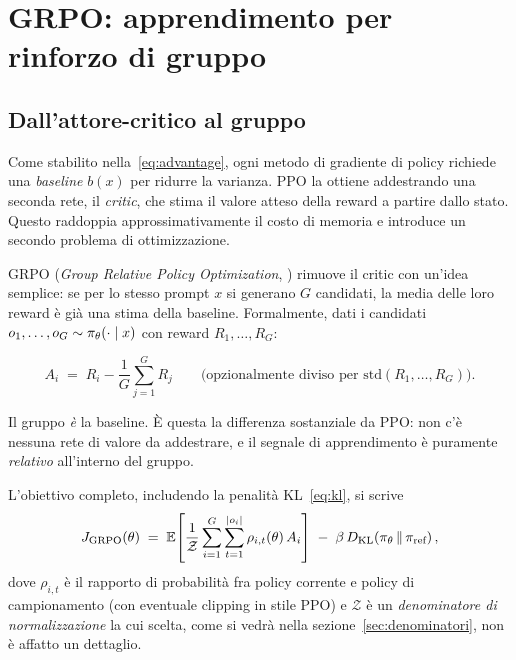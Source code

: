\chapter{GRPO: apprendimento per rinforzo di gruppo}
\label{cap:grpo}

\section{Dall'attore-critico al gruppo}

Come stabilito nella~\eqref{eq:advantage}, ogni metodo di gradiente di policy
richiede una \emph{baseline} $b(x)$ per ridurre la varianza. PPO
\cite{schulman2017ppo} la ottiene addestrando una seconda rete, il \emph{critic},
che stima il valore atteso della reward a partire dallo stato. Questo raddoppia
approssimativamente il costo di memoria e introduce un secondo problema di
ottimizzazione.

GRPO (\emph{Group Relative Policy Optimization},
\cite{shao2024grpo,guo2025r1}) rimuove il critic con un'idea semplice: se per lo
stesso prompt $x$ si generano $G$ candidati, la media delle loro reward è già una
stima della baseline. Formalmente, dati i candidati
$o_1, \dots, o_G \sim \pi_\theta(\cdot \mid x)$ con reward $R_1, \dots, R_G$:

\begin{equation}
  \label{eq:grpo-adv}
  A_i \;=\; R_i - \frac{1}{G}\sum_{j=1}^{G} R_j
  \qquad\text{(opzionalmente diviso per }
  \mathrm{std}(R_1,\dots,R_G)\text{)}.
\end{equation}

Il gruppo \emph{è} la baseline. È questa la differenza sostanziale da PPO: non
c'è nessuna rete di valore da addestrare, e il segnale di apprendimento è
puramente \emph{relativo} all'interno del gruppo.

L'obiettivo completo, includendo la penalità KL~\eqref{eq:kl}, si scrive
\begin{equation}
  \label{eq:grpo-objective}
  J_{\text{GRPO}}(\theta)
  \;=\;
  \mathbb{E}\!\left[
    \frac{1}{\mathcal{Z}} \sum_{i=1}^{G} \sum_{t=1}^{|o_i|}
    \rho_{i,t}(\theta)\, A_i
  \right]
  \;-\; \beta\, D_{\mathrm{KL}}\!\left(\pi_\theta \,\|\, \pi_{\text{ref}}\right),
\end{equation}
dove $\rho_{i,t}$ è il rapporto di probabilità fra policy corrente e policy di
campionamento (con eventuale clipping in stile PPO) e $\mathcal{Z}$ è un
\emph{denominatore di normalizzazione} la cui scelta, come si vedrà nella
sezione~\ref{sec:denominatori}, non è affatto un dettaglio.

